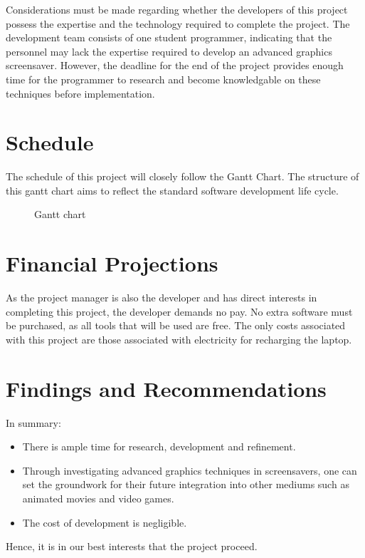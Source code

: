\documentclass[10pt, openany]{book}
\begin{document}
Considerations must be made regarding whether the developers of this project possess the expertise and the technology required to complete the project. The development team consists of one student programmer, indicating that the personnel may lack the expertise required to develop an advanced graphics screensaver. However, the deadline for the end of the project provides enough time for the programmer to research and become knowledgable on these techniques before implementation.

\section{Schedule}

The schedule of this project will closely follow the Gantt Chart.
The structure of this gantt chart aims to reflect the standard software development life cycle.

\begin{figure}[H]
	\centering
	\caption{Gantt chart}
	\label{fig:gantt}
\end{figure}	

\section{Financial Projections}

As the project manager is also the developer and has direct interests in completing this project, the developer demands no pay.
No extra software must be purchased, as all tools that will be used are free.
The only costs associated with this project are those associated with electricity for recharging the laptop.

\section{Findings and Recommendations}

In summary:
\begin{itemize}
	\item There is ample time for research, development and refinement.
	\item Through investigating advanced graphics techniques in screensavers, one can set the groundwork for their future integration into other mediums such as animated movies and video games.
	\item The cost of development is negligible.	
\end{itemize}	
Hence, it is in our best interests that the project proceed.
\end{document}
